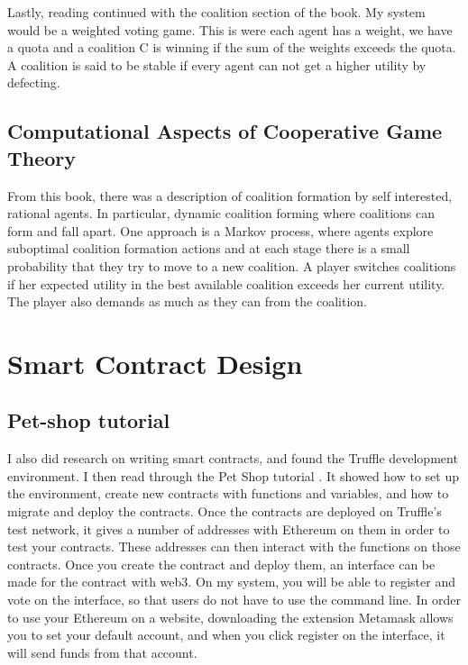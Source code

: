 Lastly, reading continued with the coalition section of the book. My system would be a weighted voting game. This is were each agent has a weight, we have a quota and a coalition C is winning if the sum of the weights exceeds the quota. A coalition is said to be stable if every agent can not get a higher utility by defecting.
\subsection{Computational Aspects of Cooperative Game Theory \cite{Chalkiadakis:2012:pdflatex}}
From this book, there was a description of coalition formation by self interested, rational agents. In particular, dynamic coalition forming where coalitions can form and fall apart. One approach is a Markov process, where agents explore suboptimal coalition formation actions and at each stage there is a small probability that they try to move to a new coalition. A player switches coalitions if her expected utility in the best available coalition exceeds her current utility. The player also demands as much as they can from the coalition.
\section{Smart Contract Design} 
\subsection{Pet-shop tutorial \cite{Truffle:2017:pdflatex}}
I also did research on writing smart contracts, and found the Truffle development environment. I then read through the Pet Shop tutorial . It showed how to set up the environment, create new contracts with functions and variables, and how to migrate and deploy the contracts. Once the contracts are deployed on Truffle's test network, it gives a number of addresses with Ethereum on them in order to test your contracts. These addresses can then interact with the functions on those contracts. Once you create the contract and deploy them, an interface can be made for the contract with web3. On my system, you will be able to register and vote on the interface, so that users do not have to use the command line. In order to use your Ethereum on a website, downloading the extension Metamask allows you to set your default account, and when you click register on the interface, it will send funds from that account.
